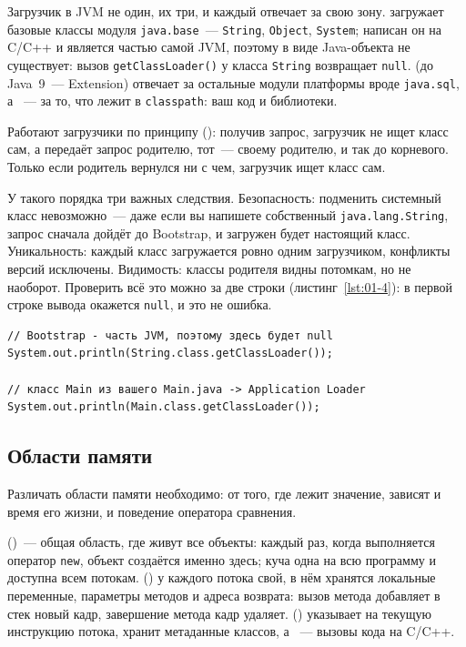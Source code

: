 Загрузчик в JVM не один, их три, и каждый отвечает за свою зону.
 загружает базовые классы модуля
\texttt{java.base}~--- \texttt{String}, \texttt{Object}, \texttt{System};
написан он на C/C++ и является частью самой JVM, поэтому в виде Java-объекта не
существует: вызов \texttt{getClassLoader()} у класса \texttt{String} возвращает
\texttt{null}.  (до Java~9~--- Extension) отвечает
за остальные модули платформы вроде \texttt{java.sql}, а
~--- за то, что лежит в \texttt{classpath}: ваш
код и библиотеки.

Работают загрузчики по принципу 
(): получив запрос, загрузчик не ищет класс сам, а
передаёт запрос родителю, тот~--- своему родителю, и так до корневого. Только
если родитель вернулся ни с чем, загрузчик ищет класс сам.

У такого порядка три важных следствия. Безопасность: подменить системный класс
невозможно~--- даже если вы напишете собственный \texttt{java.lang.String},
запрос сначала дойдёт до Bootstrap, и загружен будет настоящий класс.
Уникальность: каждый класс загружается ровно одним загрузчиком, конфликты версий
исключены. Видимость: классы родителя видны потомкам, но не наоборот. Проверить
всё это можно за две строки (листинг~\ref{lst:01-4}): в первой строке вывода
окажется \texttt{null}, и это не ошибка.

\begin{listing}[H]
\begin{verbatim}
// Bootstrap - часть JVM, поэтому здесь будет null
System.out.println(String.class.getClassLoader());

// класс Main из вашего Main.java -> Application Loader
System.out.println(Main.class.getClassLoader());
\end{verbatim}
\caption{Кто какой класс загрузил}
\label{lst:01-4}
\end{listing}

\subsection{Области памяти}

Различать области памяти необходимо: от того, где лежит значение, зависят и
время его жизни, и поведение оператора сравнения.

 ()~--- общая область, где живут все объекты: каждый раз,
когда выполняется оператор \texttt{new}, объект создаётся именно здесь; куча
одна на всю программу и доступна всем потокам.  () у
каждого потока свой, в нём хранятся локальные переменные, параметры методов и
адреса возврата: вызов метода добавляет в стек новый кадр, завершение метода
кадр удаляет.  () указывает на текущую
инструкцию потока,  хранит метаданные классов, а ~--- вызовы кода на C/C++.

